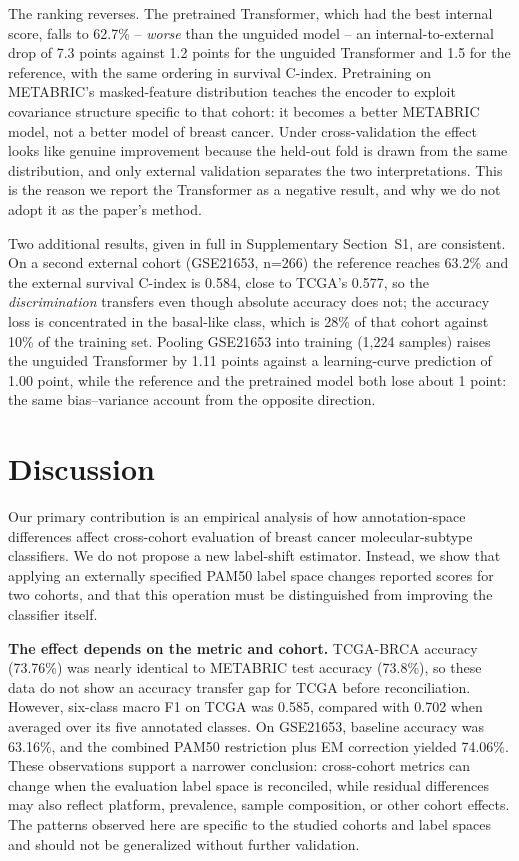 \documentclass[10pt,journal,compsoc,twocolumn]{IEEEtran}
\begin{document}
The ranking reverses. The pretrained Transformer, which had the best internal score, falls
to 62.7\% -- \emph{worse} than the unguided model -- an internal-to-external drop of 7.3
points against 1.2 points for the unguided Transformer and 1.5 for the reference, with the
same ordering in survival C-index. Pretraining on METABRIC's masked-feature distribution
teaches the encoder to exploit covariance structure specific to that cohort: it becomes a
better METABRIC model, not a better model of breast cancer. Under cross-validation the
effect looks like genuine improvement because the held-out fold is drawn from the same
distribution, and only external validation separates the two interpretations. This is the
reason we report the Transformer as a negative result, and why we do not adopt it as the
paper's method.

Two additional results, given in full in Supplementary Section~S1, are consistent. On a
second external cohort (GSE21653, n=266) the reference reaches 63.2\% and the external
survival C-index is 0.584, close to TCGA's 0.577, so the \emph{discrimination} transfers
even though absolute accuracy does not; the accuracy loss is concentrated in the
basal-like class, which is 28\% of that cohort against 10\% of the training set. Pooling
GSE21653 into training (1,224 samples) raises the unguided Transformer by 1.11 points
against a learning-curve prediction of 1.00 point, while the reference and the pretrained
model both lose about 1 point: the same bias--variance account from the opposite
direction.

\section{Discussion}

Our primary contribution is an empirical analysis of how annotation-space differences affect cross-cohort evaluation of breast cancer molecular-subtype classifiers. We do not propose a new label-shift estimator. Instead, we show that applying an externally specified PAM50 label space changes reported scores for two cohorts, and that this operation must be distinguished from improving the classifier itself.

\textbf{The effect depends on the metric and cohort.} TCGA-BRCA accuracy (73.76\%) was nearly identical to METABRIC test accuracy (73.8\%), so these data do not show an accuracy transfer gap for TCGA before reconciliation. However, six-class macro F1 on TCGA was 0.585, compared with 0.702 when averaged over its five annotated classes. On GSE21653, baseline accuracy was 63.16\%, and the combined PAM50 restriction plus EM correction yielded 74.06\%. These observations support a narrower conclusion: cross-cohort metrics can change when the evaluation label space is reconciled, while residual differences may also reflect platform, prevalence, sample composition, or other cohort effects. The patterns observed here are specific to the studied cohorts and label spaces and should not be generalized without further validation.
\end{document}
